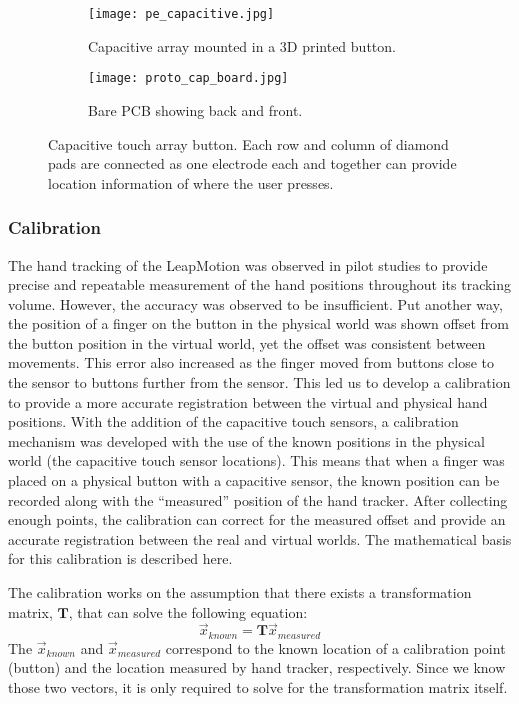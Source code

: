\begin{figure}
    \begin{subfigure}[t]{0.32\linewidth}
    \centering
    \texttt{[image: pe\_capacitive.jpg]}
    \caption{Capacitive array mounted in a 3D printed button.}
    \label{fig:proto_capacitive_array:mounted}
    \end{subfigure}
    \begin{subfigure}[t]{0.64\linewidth}
    \centering
        \texttt{[image: proto\_cap\_board.jpg]}
    \caption{Bare PCB showing back and front.}
    \label{fig:proto_capacitive_array:pcb}
    \end{subfigure}
    \caption{Capacitive touch array button. Each row and column of diamond pads are connected as one electrode each and together can provide location information of where the user presses.}
    \label{fig:proto_capacitive_array}
\end{figure}

\subsubsection{Calibration}
\label{sec:proto-calibration}

The hand tracking of the LeapMotion was observed in pilot studies to provide precise and repeatable measurement of the hand positions throughout its tracking volume.
However, the accuracy was observed to be insufficient.
Put another way, the position of a finger on the button in the physical world was shown offset from the button position in the virtual world, yet the offset was consistent between movements.
This error also increased as the finger moved from buttons close to the sensor to buttons further from the sensor.
This led us to develop a calibration to provide a more accurate registration between the virtual and physical hand positions.
With the addition of the capacitive touch sensors, a calibration mechanism was developed with the use of the known positions in the physical world (the capacitive touch sensor locations).
This means that when a finger was placed on a physical button with a capacitive sensor, the known position can be recorded along with the ``measured'' position of the hand tracker.
After collecting enough points, the calibration can correct for the measured offset and provide an accurate registration between the real and virtual worlds.
The mathematical basis for this calibration is described here.

The calibration works on the assumption that there exists a transformation matrix, $\mathbf{T}$, that can solve the following equation:
\begin{equation}
    \vec{x}_{known} = \mathbf{T}\vec{x}_{measured}
    \label{eq:proto_Tvec}
\end{equation}
The $\vec{x}_{known}$ and $\vec{x}_{measured}$ correspond to the known location of a calibration point (button) and the location measured by hand tracker, respectively.
Since we know those two vectors, it is only required to solve for the transformation matrix itself.

